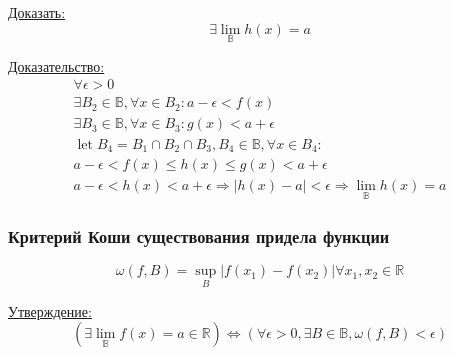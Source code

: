 \documentclass{article}
\DeclareMathOperator*{\Let}{let}
\begin{document}
\underline{Доказать:}
\[
\exists \lim_{\mathbb{B}} h(x) = a
\]

\underline{Доказательство:}
\begin{gather*}
	\forall \epsilon > 0 \\
	\exists B_2 \in \mathbb{B}, \forall x \in B_2 : a - \epsilon < f(x) \\
	\exists B_3 \in \mathbb{B}, \forall x \in B_3 : g(x) < a + \epsilon \\
	\Let B_4 = B_1 \cap B_2 \cap B_3, B_4 \in \mathbb{B}, \forall x \in B_4 : \\
	a - \epsilon < f(x) \le h(x) \le g(x) < a + \epsilon \\
	a - \epsilon < h(x) < a + \epsilon \Rightarrow |h(x) - a| < \epsilon \Rightarrow
	\lim_{\mathbb{B}} h(x) = a
\end{gather*}

\subsubsection{Критерий Коши существования придела функции}

\[
\omega(f, B) = \sup \limits_{B} |f(x_1) - f(x_2)| \forall x_1, x_2 \in \mathbb{R}
\]

\underline{Утверждение:}
\[
\left(
	\exists \lim_{\mathbb{B}} f(x) = a \in \mathbb{R}
\right) \Leftrightarrow \left(
	\forall \epsilon > 0, \exists B \in \mathbb{B}, \omega(f, B) < \epsilon
\right)
\]
\end{document}
